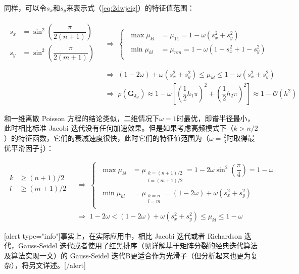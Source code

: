 \documentclass[12pt, UTF8, nofonts]{ctexart}
\begin{document}
同样，可以令$s_x$和$s_y$来表示式（\ref{eq:2dwjeig}）的特征值范围：

\begin{equation}
  \label{eq:2dwjeigrange}
  \begin{aligned}
    \begin{aligned}
      s_x &= \sin^2\left(\dfrac{\pi}{2(n+1)}\right) \\
      s_y &= \sin^2\left(\dfrac{\pi}{2(m+1)}\right) \\
    \end{aligned} \;&\Rightarrow\;
    \left\{\; \begin{aligned}
      \max\mu_{kl} &= \mu_{11} = 1 - \omega (s_x^2 + s_y^2) \\
      \min\mu_{kl} &= \mu_{nm} = 1 - \omega (1 - s_x^2 + 1 - s_y^2) \\
    \end{aligned} \right. \\
    \;&\Rightarrow\; (1-2\omega) + \omega(s_x^2+s_y^2) \leq \mu_{kl} \leq 1 - \omega(s_x^2+s_y^2) \\
    \;&\Rightarrow\; \rho(\boldsymbol{G}_{\mathrm{J}_\omega}) \approx 1 - \omega \left[ \left(\dfrac{1}{2}h_1\pi\right)^2 + \left(\dfrac{1}{2}h_2\pi\right)^2 \right] \approx 1 - \mathcal{O}(h^2)
  \end{aligned}
\end{equation}

和一维离散 Poisson 方程的结论类似，二维情况下$\omega=1$时最优，即谱半径最小，此时相比标准 Jacobi 迭代没有任何加速效果。但是如果考虑高频模式下（$k>n/2$）的特征函数，它们的衰减速度很快，此时它们的特征值范围为（$\omega=\frac{2}{3}$时取得最优平滑因子$\frac{1}{3}$）：

\begin{equation}
  \label{eq:1dhighrange}
  \begin{aligned}
    \begin{aligned}
      k &\geq (n+1)/2 \\
      l &\geq (m+1)/2 \\
    \end{aligned}
    \;&\Rightarrow\;
    \left\{\; \begin{aligned}
      \max\mu_{kl} &= \mu_{\substack{k=(n+1)/2\\l=(m+1)/2}} = 1 - 2\omega \sin^2\left(\dfrac{\pi}{4}\right) = 1 - \omega \\
      \min\mu_{kl} &= \mu_{\substack{k=n\\l=m}} = (1-2\omega)+\omega (s_x^2+s_y^2) \\
    \end{aligned}\right. \\
    &\Rightarrow\; 1-2\omega < (1-2\omega) + \omega (s_x^2+s_y^2) \leq \mu_{kl} \leq 1 - \omega
  \end{aligned}
\end{equation}

[alert type="info"]事实上，在实际应用中，相比 Jacobi 迭代或者 Richardson 迭代，Gauss-Seidel 迭代或者使用了红黑排序（见详解基于矩阵分裂的经典迭代算法及算法实现一文）的 Gauss-Seidel 迭代B更适合作为光滑子（但分析起来也更为复杂），将另文详述。[/alert]

\end{document}
